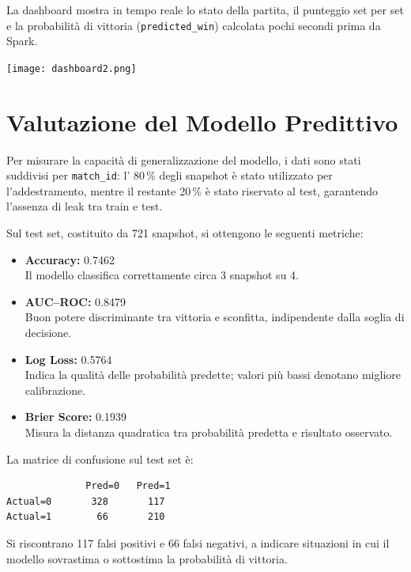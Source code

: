 \documentclass[a4paper,12pt]{report}
\begin{document}
La dashboard mostra in tempo reale lo stato della partita, il punteggio set per set e la probabilità di vittoria (\texttt{predicted\_win}) calcolata pochi secondi prima da Spark.

\noindent\begin{minipage}{\textwidth}
  \centering
    \texttt{[image: dashboard2.png]}
    \label{fig:dashboard}
\end{minipage}

\section{Valutazione del Modello Predittivo}

Per misurare la capacità di generalizzazione del modello, i dati sono stati suddivisi per \texttt{match\_id}: l' 80\,\% degli snapshot è stato utilizzato per l’addestramento, mentre il restante 20\,\% è stato riservato al test, garantendo l’assenza di leak tra train e test.

Sul test set, costituito da 721 snapshot, si ottengono le seguenti metriche:

\begin{itemize}
  \item \textbf{Accuracy:} 0.7462 \\
    Il modello classifica correttamente circa 3 snapshot su 4.
  \item \textbf{AUC–ROC:} 0.8479 \\
    Buon potere discriminante tra vittoria e sconfitta, indipendente dalla soglia di decisione.
  \item \textbf{Log Loss:} 0.5764 \\
    Indica la qualità delle probabilità predette; valori più bassi denotano migliore calibrazione.
  \item \textbf{Brier Score:} 0.1939 \\
    Misura la distanza quadratica tra probabilità predetta e risultato osservato.
\end{itemize}

\noindent La matrice di confusione sul test set è:

\begin{verbatim}
              Pred=0   Pred=1
Actual=0       328       117
Actual=1        66       210
\end{verbatim}

Si riscontrano 117 falsi positivi e 66 falsi negativi, a indicare situazioni in cui il modello sovrastima o sottostima la probabilità di vittoria.
\end{document}
